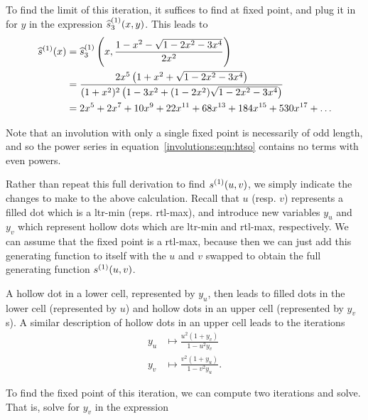     To find the limit of this iteration, it suffices to find at fixed point,
    and plug it in for $y$ in the expression $\widehat{s}^{(1)}_3(x,y)$. 
    This leads to 
    \begin{equation} \label{involutions:eqn:htso}
      \begin{split}
      \htso(x) 
      &= \htso_3 \left(x, \frac{1 - x^2 - \sqrt{1-2x^2 - 3x^4}}{2x^2}\right) \\
      &= \frac{2x^5 \left(1 + x^2 + \sqrt{1 - 2x^2-3x^4}\right)}{%
          (1+x^2)^2 \left(1 - 3x^2 + (1-2x^2)\sqrt{1-2x^2-3x^4}\right)} \\
      &= 2x^5 + 2x^7 + 10x^9 + 22x^{11} + 68x^{13} + 184x^{15} + 530x^{17}
      +\dots \\
      \end{split}
    \end{equation}

    Note that an involution with only a single fixed point is necessarily of
    odd length, and so the power series in equation~\ref{involutions:eqn:htso}
    contains no terms with even powers. 


    Rather than repeat this full derivation to find $s^{(1)}(u,v)$, we simply
    indicate the changes to make to the above calculation.  Recall that $u$
    (resp. $v$) represents a filled dot which is a ltr-min (reps. rtl-max), and
    introduce new variables $y_u$ and $y_v$ which represent hollow dots which
    are ltr-min and rtl-max, respectively.  We can assume that the fixed point
    is a rtl-max, because then we can just add this generating function to
    itself with the $u$ and $v$ swapped to obtain the full generating function
    $s^{(1)}(u,v)$. 

    A hollow dot in a lower cell, represented by $y_u$, then leads to filled
    dots in the lower cell (represented by $u$) and hollow dots in an upper
    cell (represented by $y_v$s).  A similar description of hollow dots in an
    upper cell leads to the iterations
    \begin{equation}\label{involutions:eqn:dual-iterations}
      \begin{split}
      y_u &\mapsto \frac{u^2 (1 + y_v)}{1 - u^2 y_v} \\ 
      y_v &\mapsto \frac{v^2 (1 + y_u)}{1 - v^2 y_u}.
      \end{split}
    \end{equation}

    To find the fixed point of this iteration, we can compute two iterations
    and solve. That is, solve for $y_v$ in the expression 

